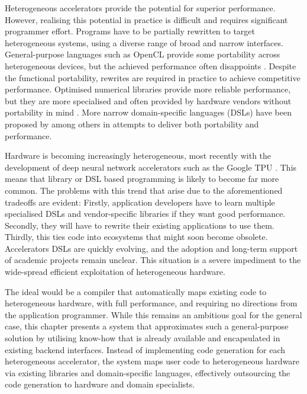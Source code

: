     Heterogeneous accelerators provide the potential for superior performance.
    However, realising this potential in practice is difficult and requires
    significant programmer effort.
    Programs have to be partially rewritten to target heterogeneous systems,
    using a diverse range of broad and narrow interfaces.
    General-purpose languages such as OpenCL \citep{nvidia11guide} provide
    some portability across heterogeneous devices, but the achieved performance
    often disappoints \citep{lee09openmp}.
    Despite the functional portability, rewrites are required in practice to
    achieve competitive performance.
    Optimised numerical libraries provide more reliable performance, but they
    are more specialised and often provided by hardware vendors without
    portability in mind \citep{clblas,cublas,cusparse,clsparse}.
    More narrow domain-specific languages (DSLs) have been proposed by
    \citet{Ragan-Kelley2013Halide,Franchetti09OL,Rompf:2012:LMS:2184319.2184345}
    among others in attempts to deliver both portability and performance.

    Hardware is becoming increasingly heterogeneous, most recently with the
    development of deep neural network accelerators such as the Google TPU
    \citep{jouppi2017datacenter}.
    This means that library or DSL based programming is likely to become far
    more common.
    The problems with this trend that arise due to the aforementioned tradeoffs
    are evident:
    Firstly, application developers have to learn multiple specialised DSLs and
    vendor-specific libraries if they want good performance.
    Secondly, they will have to rewrite their existing applications to use them.
    Thirdly, this ties code into ecosystems that might soon become obsolete.
    Accelerators DSLs are quickly evolving, and the adoption and long-term
    support of academic projects remain unclear.
    This situation is a severe impediment to the wide-spread efficient
    exploitation of heterogeneous hardware.

    The ideal would be a compiler that automatically maps existing code to
    heterogeneous hardware, with full performance, and requiring no directions
    from the application programmer.
    While this remains an ambitious goal for the general case, this chapter
    presents a system that approximates such a general-purpose solution by
    utilising know-how that is already available and encapsulated in existing
    backend interfaces.
    Instead of implementing code generation for each heterogeneous
    accelerator, the system maps user code to heterogeneous hardware via
    existing libraries and domain-specific languages, effectively outsourcing
    the code generation to hardware and domain specialists.

